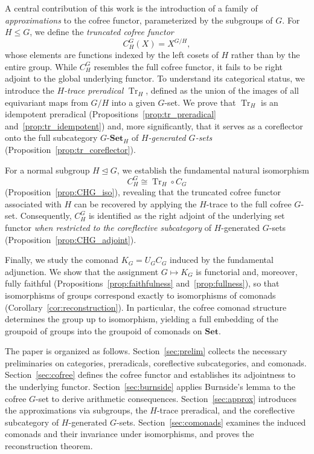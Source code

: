 \documentclass{amsart}
\begin{document}
A central contribution of this work is the introduction of a family of \emph{approximations} to the cofree functor, parameterized by the subgroups of $G$. For $H \leq G$, we define the \emph{truncated cofree functor}
\[
C_H^G(X) = X^{G/H},
\]
whose elements are functions indexed by the left cosets of $H$ rather than by the entire group. While $C_H^G$ resembles the full cofree functor, it fails to be right adjoint to the global underlying functor. To understand its categorical status, we introduce the \emph{$H$-trace preradical} $\operatorname{Tr}_H$, defined as the union of the images of all equivariant maps from $G/H$ into a given $G$-set. We prove that $\operatorname{Tr}_H$ is an idempotent preradical (Propositions~\ref{prop:tr_preradical} and~\ref{prop:tr_idempotent}) and, more significantly, that it serves as a coreflector onto the full subcategory $G\text{-}\mathbf{Set}_H$ of \emph{$H$-generated $G$-sets} (Proposition~\ref{prop:tr_coreflector}).

For a normal subgroup $H \trianglelefteq G$, we establish the fundamental natural isomorphism
\[
C_H^G \cong \operatorname{Tr}_H \circ C_G
\]
(Proposition~\ref{prop:CHG_iso}), revealing that the truncated cofree functor associated with $H$ can be recovered by applying the $H$-trace to the full cofree $G$-set. Consequently, $C_H^G$ is identified as the right adjoint of the underlying set functor \emph{when restricted to the coreflective subcategory} of $H$-generated $G$-sets (Proposition~\ref{prop:CHG_adjoint}).  

Finally, we study the comonad $K_G = U_G C_G$ induced by the fundamental adjunction. We show that the assignment $G \mapsto K_G$ is functorial and, moreover, fully faithful (Propositions~\ref{prop:faithfulness} and~\ref{prop:fullness}), so that isomorphisms of groups correspond exactly to isomorphisms of comonads (Corollary~\ref{cor:reconstruction}). In particular, the cofree comonad structure determines the group up to isomorphism, yielding a full embedding of the groupoid of groups into the groupoid of comonads on $\mathbf{Set}$.

The paper is organized as follows. Section~\ref{sec:prelim} collects the necessary preliminaries on categories, preradicals, coreflective subcategories, and comonads. Section~\ref{sec:cofree} defines the cofree functor and establishes its adjointness to the underlying functor. Section~\ref{sec:burnside} applies Burnside's lemma to the cofree $G$-set to derive arithmetic consequences. Section~\ref{sec:approx} introduces the approximations via subgroups, the $H$-trace preradical, and the coreflective subcategory of $H$-generated $G$-sets. Section~\ref{sec:comonads} examines the induced comonads and their invariance under isomorphisms, and proves the reconstruction theorem.
\end{document}
